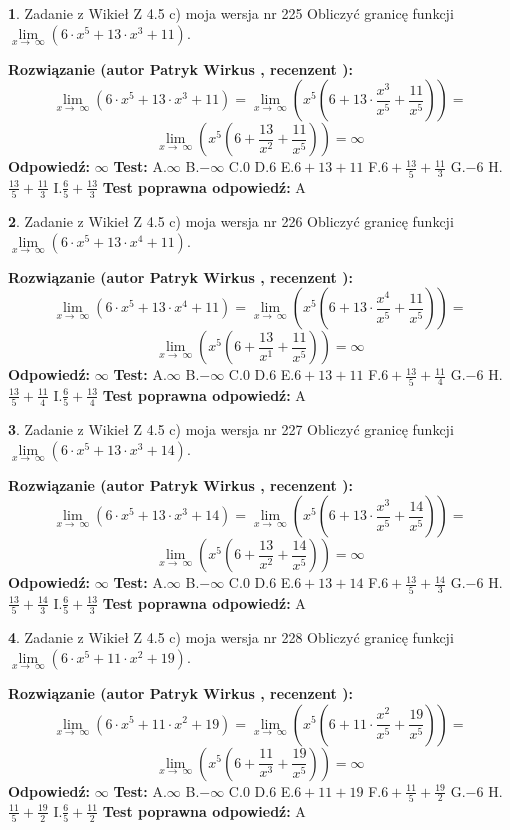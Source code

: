 \documentclass[12pt, a4paper]{article}
\theoremstyle{definition} %
\newtheorem{zad}{}
\newcommand{\zadStart}[1]{\begin{zad}#1\newline}
\newcommand{\zadStop}{\end{zad}}
\newcommand{\rozwStart}[2]{\noindent \textbf{Rozwiązanie (autor #1 , recenzent #2): }\newline}
\newcommand{\rozwStop}{\newline}
\newcommand{\odpStart}{\noindent \textbf{Odpowiedź:}\newline}
\newcommand{\odpStop}{\newline}
\newcommand{\testStart}{\noindent \textbf{Test:}\newline}
\newcommand{\testStop}{\newline}
\newcommand{\kluczStart}{\noindent \textbf{Test poprawna odpowiedź:}\newline}
\newcommand{\kluczStop}{\newline}
\begin{document}
\zadStart{Zadanie z Wikieł Z 4.5 c) moja wersja nr 225}
Obliczyć granicę funkcji  $\lim\limits_{x\to\ \infty}(6 \cdot x^{5}+13 \cdot x^{3}+11)$.
\zadStop
\rozwStart{Patryk Wirkus}{}
$$\lim\limits_{x\to\ \infty}(6 \cdot x^{5}+13 \cdot x^{3}+11) = \lim\limits_{x\to\ \infty}(x^{5}(6 +13 \cdot \frac{x^{3}}{x^{5}}+\frac{11}{x^{5}})) =$$ $$\lim\limits_{x\to\ \infty}(x^{5}(6 +\frac{13}{x^{2}}+\frac{11}{x^{5}})) =\infty$$
\rozwStop
\odpStart
$\infty$
\odpStop
\testStart
A.$\infty$ B.$-\infty$ C.$0$ D.$6$ E.$6 + 13 + 11$
F.$6+\frac{13}{5}+\frac{11}{3}$ G.$-6$
H.$\frac{13}{5}+\frac{11}{3}$
I.$\frac{6}{5}+\frac{13}{3}$
\testStop
\kluczStart
A
\kluczStop



\zadStart{Zadanie z Wikieł Z 4.5 c) moja wersja nr 226}
Obliczyć granicę funkcji  $\lim\limits_{x\to\ \infty}(6 \cdot x^{5}+13 \cdot x^{4}+11)$.
\zadStop
\rozwStart{Patryk Wirkus}{}
$$\lim\limits_{x\to\ \infty}(6 \cdot x^{5}+13 \cdot x^{4}+11) = \lim\limits_{x\to\ \infty}(x^{5}(6 +13 \cdot \frac{x^{4}}{x^{5}}+\frac{11}{x^{5}})) =$$ $$\lim\limits_{x\to\ \infty}(x^{5}(6 +\frac{13}{x^{1}}+\frac{11}{x^{5}})) =\infty$$
\rozwStop
\odpStart
$\infty$
\odpStop
\testStart
A.$\infty$ B.$-\infty$ C.$0$ D.$6$ E.$6 + 13 + 11$
F.$6+\frac{13}{5}+\frac{11}{4}$ G.$-6$
H.$\frac{13}{5}+\frac{11}{4}$
I.$\frac{6}{5}+\frac{13}{4}$
\testStop
\kluczStart
A
\kluczStop



\zadStart{Zadanie z Wikieł Z 4.5 c) moja wersja nr 227}
Obliczyć granicę funkcji  $\lim\limits_{x\to\ \infty}(6 \cdot x^{5}+13 \cdot x^{3}+14)$.
\zadStop
\rozwStart{Patryk Wirkus}{}
$$\lim\limits_{x\to\ \infty}(6 \cdot x^{5}+13 \cdot x^{3}+14) = \lim\limits_{x\to\ \infty}(x^{5}(6 +13 \cdot \frac{x^{3}}{x^{5}}+\frac{14}{x^{5}})) =$$ $$\lim\limits_{x\to\ \infty}(x^{5}(6 +\frac{13}{x^{2}}+\frac{14}{x^{5}})) =\infty$$
\rozwStop
\odpStart
$\infty$
\odpStop
\testStart
A.$\infty$ B.$-\infty$ C.$0$ D.$6$ E.$6 + 13 + 14$
F.$6+\frac{13}{5}+\frac{14}{3}$ G.$-6$
H.$\frac{13}{5}+\frac{14}{3}$
I.$\frac{6}{5}+\frac{13}{3}$
\testStop
\kluczStart
A
\kluczStop



\zadStart{Zadanie z Wikieł Z 4.5 c) moja wersja nr 228}
Obliczyć granicę funkcji  $\lim\limits_{x\to\ \infty}(6 \cdot x^{5}+11 \cdot x^{2}+19)$.
\zadStop
\rozwStart{Patryk Wirkus}{}
$$\lim\limits_{x\to\ \infty}(6 \cdot x^{5}+11 \cdot x^{2}+19) = \lim\limits_{x\to\ \infty}(x^{5}(6 +11 \cdot \frac{x^{2}}{x^{5}}+\frac{19}{x^{5}})) =$$ $$\lim\limits_{x\to\ \infty}(x^{5}(6 +\frac{11}{x^{3}}+\frac{19}{x^{5}})) =\infty$$
\rozwStop
\odpStart
$\infty$
\odpStop
\testStart
A.$\infty$ B.$-\infty$ C.$0$ D.$6$ E.$6 + 11 + 19$
F.$6+\frac{11}{5}+\frac{19}{2}$ G.$-6$
H.$\frac{11}{5}+\frac{19}{2}$
I.$\frac{6}{5}+\frac{11}{2}$
\testStop
\kluczStart
A
\kluczStop
\end{document}
